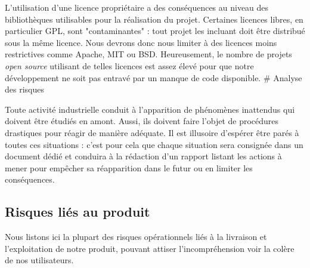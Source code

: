 \documentclass[10pt,twocolumn,a4paper,utf8x]{article}
\begin{document}
L'utilisation d'une licence propriétaire a des conséquences au niveau
des bibliothèques utilisables pour la réalisation du projet. Certaines
licences libres, en particulier GPL, sont "contaminantes" : tout
projet les incluant doit être distribué sous la même licence. Nous
devrons donc nous limiter à des licences moins restrictives comme
Apache, MIT ou BSD. Heureusement, le nombre de projets \emph{open
source} utilisant de telles licences est assez élevé pour que notre
développement ne soit pas entravé par un manque de code disponible. \#
Analyse des risques

Toute activité industrielle conduit à l'apparition de phénomènes
inattendus qui doivent être étudiés en amont. Aussi, ils doivent faire
l'objet de procédures drastiques pour réagir de manière adéquate. Il est
illusoire d'espérer être parés à toutes ces situations : c'est pour cela
que chaque situation sera consignée dans un document dédié et conduira à
la rédaction d'un rapport listant les actions à mener pour empêcher sa
réapparition dans le futur ou en limiter les conséquences.

\subsection{Risques liés au produit}

Nous listons ici la plupart des risques opérationnels liés à la
livraison et l'exploitation de notre produit, pouvant attiser
l'incompréhension voir la colère de nos utilisateurs.
\end{document}
